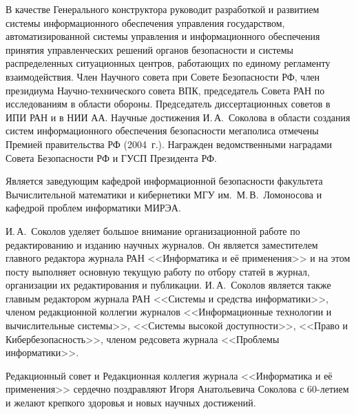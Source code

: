 \begin{multicols}{2}
В качестве Генерального конструктора руководит разработкой и развитием
системы информа\-ци\-онного обеспечения управления государством,
автоматизированной сис\-те\-мы управ\-ле\-ния и информационного обеспечения
принятия управленческих решений органов безопасности и системы распределенных
ситуационных центров, работа\-ющих по единому регламенту взаимодействия.
Член Научного совета при Совете Безопасности РФ, член президиума
На\-уч\-но-тех\-ни\-че\-ско\-го совета ВПК, председатель Совета РАН по
исследованиям в области обороны. Председатель диссертационных советов в ИПИ РАН
и в НИИ АА. Научные достижения И.\,А.~Соколова в области создания сис\-тем
информационного обеспечения безопасности мегаполиса отмечены Премией правительства
РФ (2004~г.). Награжден ведомственными наградами Совета Безопасности РФ и ГУСП
 Президента РФ.

Является заведующим кафедрой информационной безопасности факультета Вычислительной математики и кибернетики МГУ им.\ М.\,В.~Ломоносова и кафедрой проблем информатики МИРЭА.

И.\,А.~Соколов уделяет большое внимание организационной работе по
редактированию и изданию научных журналов. Он является заместителем главного
редактора журнала РАН <<Информатика и её применения>> и на этом посту
выполняет основную текущую работу по отбору статей в журнал, организации их
редактирования и публикации. И.\,А.~Соколов является также главным редактором
журнала РАН <<Системы и средства информатики>>, членом редакционной
коллегии журналов <<Информационные технологии и вычислительные системы>>,
<<Сис\-те\-мы высокой доступности>>, <<Право и Кибербезопасность>>, членом
редсовета журнала <<Проб\-ле\-мы информатики>>.

\bigskip

Редакционный совет и Редакционная коллегия журнала <<Информатика и её применения>> сердечно поздравляют Игоря Анатольевича Соколова с 60-ле\-ти\-ем и желают крепкого здоровья и новых научных достижений.


\label{end\stat}


\end{multicols}

